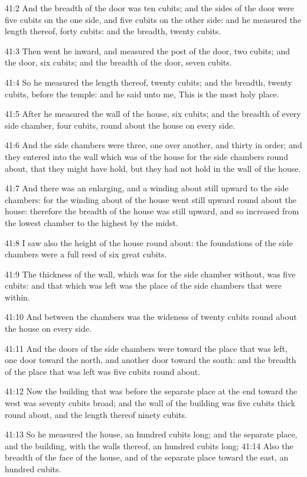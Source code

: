 41:2 And the breadth of the door was ten cubits; and the sides of the door were five cubits on the one side, and five cubits on the other side: and he measured the length thereof, forty cubits: and the breadth, twenty cubits.

41:3 Then went he inward, and measured the post of the door, two cubits; and the door, six cubits; and the breadth of the door, seven cubits.

41:4 So he measured the length thereof, twenty cubits; and the breadth, twenty cubits, before the temple: and he said unto me, This is the most holy place.

41:5 After he measured the wall of the house, six cubits; and the breadth of every side chamber, four cubits, round about the house on every side.

41:6 And the side chambers were three, one over another, and thirty in order; and they entered into the wall which was of the house for the side chambers round about, that they might have hold, but they had not hold in the wall of the house.

41:7 And there was an enlarging, and a winding about still upward to the side chambers: for the winding about of the house went still upward round about the house: therefore the breadth of the house was still upward, and so increased from the lowest chamber to the highest by the midst.

41:8 I saw also the height of the house round about: the foundations of the side chambers were a full reed of six great cubits.

41:9 The thickness of the wall, which was for the side chamber without, was five cubits: and that which was left was the place of the side chambers that were within.

41:10 And between the chambers was the wideness of twenty cubits round about the house on every side.

41:11 And the doors of the side chambers were toward the place that was left, one door toward the north, and another door toward the south: and the breadth of the place that was left was five cubits round about.

41:12 Now the building that was before the separate place at the end toward the west was seventy cubits broad; and the wall of the building was five cubits thick round about, and the length thereof ninety cubits.

41:13 So he measured the house, an hundred cubits long; and the separate place, and the building, with the walls thereof, an hundred cubits long; 41:14 Also the breadth of the face of the house, and of the separate place toward the east, an hundred cubits.

